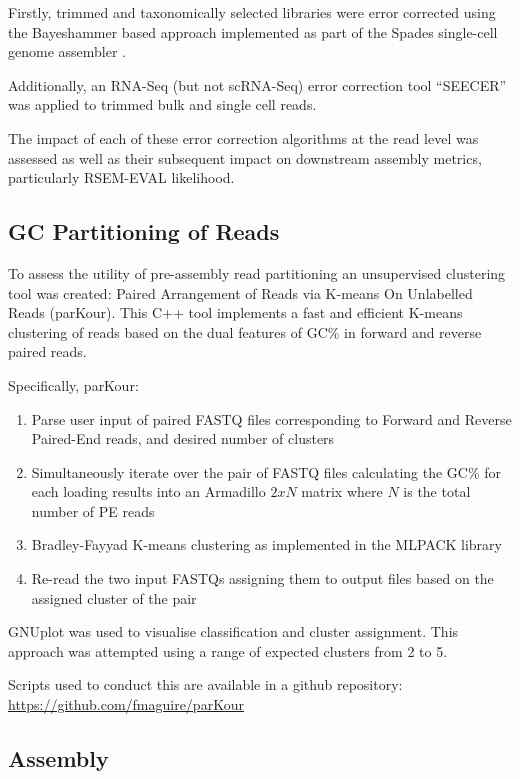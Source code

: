 Firstly, trimmed and taxonomically selected libraries were error corrected using the
Bayeshammer \citep{Nikolenko2013} based approach implemented as part of the Spades single-cell  
genome assembler \citep{Bankevich2012}.

Additionally, an RNA-Seq (but not scRNA-Seq) error correction tool ``SEECER'' \citep{Le2013} was 
applied to trimmed bulk and single cell reads.

The impact of each of these error correction algorithms at the read level was assessed as well 
as their subsequent impact on downstream assembly metrics, particularly RSEM-EVAL likelihood.


\subsection{GC Partitioning of Reads}

To assess the utility of pre-assembly read partitioning an unsupervised clustering tool was created:
Paired Arrangement of Reads via K-means On Unlabelled Reads (parKour).
This C++ tool implements a fast and efficient K-means clustering of reads based on the dual features
of GC\% in forward and reverse paired reads.

Specifically, parKour:
\begin{enumerate}
    \item Parse user input of paired FASTQ files corresponding to Forward and Reverse Paired-End reads, and desired number of clusters
    \item Simultaneously iterate over the pair of FASTQ files calculating the GC\% for each loading results into an Armadillo \(2xN\) matrix \citep{Sanderson2010} where \(N\) is the total number of PE reads
    \item Bradley-Fayyad K-means \citep{Bradley1998} clustering as implemented in the MLPACK library \citep{mlpack2013}
    \item Re-read the two input FASTQs assigning them to output files based on the assigned cluster of the pair
\end{enumerate}

GNUplot \citep{Gnuplot_4.4} was used to visualise classification and cluster assignment.
This approach was attempted using a range of expected clusters from 2 to 5.

Scripts used to conduct this are available in a github repository:
\url{https://github.com/fmaguire/parKour}


\subsection{Assembly}

